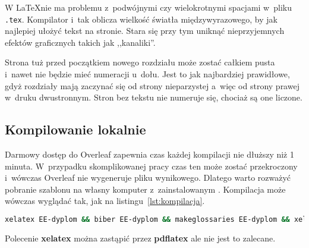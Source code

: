 W \LaTeX nie ma problemu z~podwójnymi  czy wielokrotnymi      spacjami w~pliku \texttt{.tex}. Kompilator i~tak oblicza wielkość światła międzywyrazowego, by jak najlepiej ułożyć tekst na stronie. Stara się przy tym uniknąć nieprzyjemnych efektów graficznych takich jak ,,kanaliki''.

Strona tuż przed początkiem nowego rozdziału może zostać całkiem pusta i~nawet nie będzie mieć numeracji u~dołu. Jest to jak najbardziej prawidłowe, gdyż rozdziały mają zaczynać się od strony nieparzystej a~więc od strony prawej w~druku dwustronnym. Stron bez tekstu nie numeruje się, chociaż są one liczone.

\subsection{Kompilowanie lokalnie}
Darmowy dostęp do Overleaf zapewnia czas każdej kompilacji nie dłuższy niż 1 minuta. W~przypadku skomplikowanej pracy czas ten może zostać przekroczony i~wówczas Overleaf nie wygeneruje pliku wynikowego. Dlatego warto rozważyć pobranie szablonu na własny komputer z~zainstalowanym . Kompilacja może wówczas wyglądać tak, jak na listingu~\ref{lst:kompilacja}.

\begin{lstlisting}[language=bash,
    caption={Kompilacja pracy dyplomowej lokalnie},
    label={lst:kompilacja}]
xelatex EE-dyplom && biber EE-dyplom && makeglossaries EE-dyplom && xelatex EE-dyplom && xelatex EE-dyplom
\end{lstlisting}

Polecenie \textbf{xelatex} można zastąpić przez \textbf{pdflatex} ale nie jest to zalecane.

